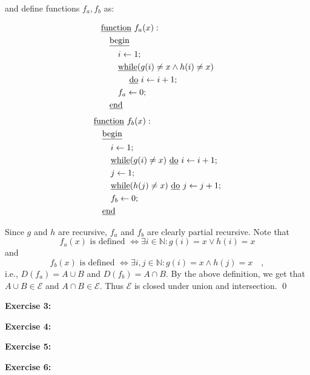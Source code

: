 \documentclass [11pt]{article}
\newcommand{\E}{\ensuremath{\mathcal{E}}}
\newcommand{\N}{\ensuremath{\mathbb{N}}}
\begin{document}
\noindent
and define functions $f_a, f_b$ as:
\begin{multicols}{2}
\noindent
\begin{align*}
& \text{\underline{function} } f_a(x): \\
& \quad \text{\underline{begin}} \\
& \quad \quad i \leftarrow 1; \\
& \quad \quad \text{\underline{while}} (g(i) \neq x \land h(i) \neq x) \\
& \quad \quad \quad \text{ \underline{do} } i \leftarrow i +1; \\
& \quad \quad f_a \leftarrow 0; \\
& \quad \text{\underline{end}}
\end{align*}
\begin{align*}
& \text{\underline{function} } f_b(x): \\
& \quad \text{\underline{begin}} \\
& \quad \quad i \leftarrow 1; \\
& \quad \quad \text{\underline{while}} (g(i) \neq x) \text{ \underline{do} } i \leftarrow i + 1; \\
& \quad \quad j \leftarrow 1; \\
& \quad \quad \text{\underline{while}} (h(j) \neq x) \text{ \underline{do} } j \leftarrow j + 1; \\
& \quad \quad f_b \leftarrow 0; \\
& \quad \text{\underline{end}}
\end{align*}
\end{multicols}
\noindent
Since $g$ and $h$ are recursive, $f_a$ and $f_b$ are clearly partial recursive. 
Note that 
$$
f_a(x) \text{ is defined } \iff \exists i \in \N: g(i) = x \lor h(i) = x
$$
and 
$$
f_b(x) \text{ is defined } \iff \exists i,j \in \N: g(i) = x \land h(j) = x \quad ,
$$
i.e., $D(f_a) = A \cup B$ and $D(f_b) = A \cap B$.
By the above definition, we get that $A\cup B \in \E$ and $A \cap B \in \E$. 
Thus $\E$ is closed under union and intersection. \qed


\bigskip
\noindent
\textbf{Exercise 3:}

\bigskip
\noindent
\textbf{Exercise 4:}

\bigskip
\noindent
\textbf{Exercise 5:}

\bigskip
\noindent
\textbf{Exercise 6:}
\end{document}
